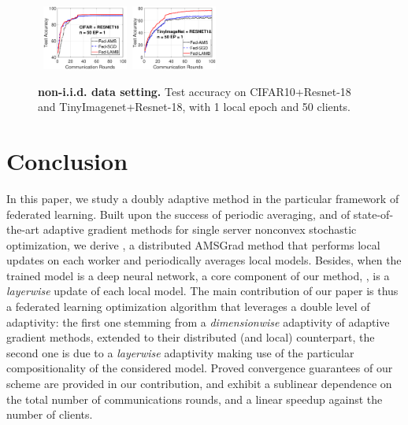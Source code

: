 \documentclass[twoside]{article}
\begin{document}
\begin{figure}[t]
    \begin{center}
        \mbox{
        \hspace{-0.05in}\includegraphics[width=0.25\textwidth]{new_figure/cifar_testerror_resnet18_ep1_client2_iid0.eps}
        \hspace{-0.1in}\includegraphics[width=0.25\textwidth]{new_figure/tinyimagenet_testerror_resnet18_ep1_client2_iid0.eps}
        }
    \end{center}
    \vspace{0.15in}
	\caption{\textbf{non-i.i.d. data setting.} Test accuracy on CIFAR10+Resnet-18 and TinyImagenet+Resnet-18, with 1 local epoch and 50 clients.
	}
	\label{fig:noniidresnet18}
\end{figure}



\section{Conclusion}\label{sec:conclusion}

In this paper, we study a doubly adaptive method in the particular framework of federated learning.
Built upon the success of periodic averaging, and of state-of-the-art adaptive gradient methods for single server nonconvex stochastic optimization, we derive \algo, a distributed AMSGrad method that performs local updates on each worker and periodically averages local models. 
Besides, when the trained model is a deep neural network, a core component of our method, \algo, is a \emph{layerwise} update of each local model.
The main contribution of our paper is thus a federated learning optimization algorithm that leverages a double level of adaptivity: the first one stemming from a \emph{dimensionwise} adaptivity of adaptive gradient methods, extended to their distributed (and local) counterpart, the second one is due to a  \emph{layerwise} adaptivity making use of the particular compositionality of the considered model.
Proved convergence guarantees of our scheme are provided in our contribution, and exhibit a sublinear dependence on the total number of communications rounds, and a linear speedup against the number of clients. 
\end{document}
